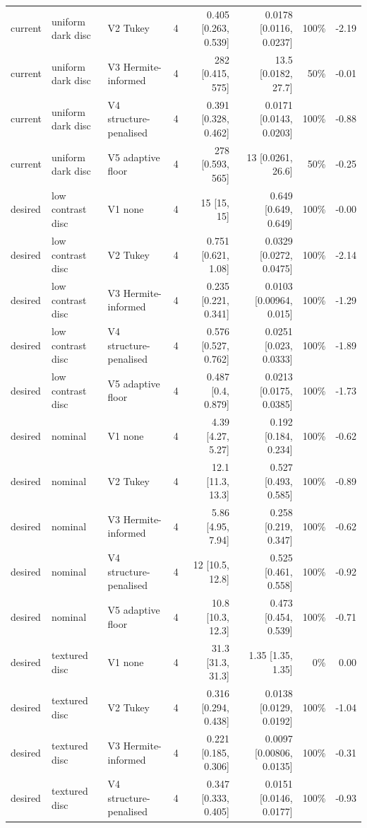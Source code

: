 \begin{tabular}{@{}lllrrrrr@{}}
current & uniform dark disc & V2 Tukey & 4 & 0.405 [0.263, 0.539] & 0.0178 [0.0116, 0.0237] & 100\% & -2.19 \\
current & uniform dark disc & V3 Hermite-informed & 4 & 282 [0.415, 575] & 13.5 [0.0182, 27.7] & 50\% & -0.01 \\
current & uniform dark disc & V4 structure-penalised & 4 & 0.391 [0.328, 0.462] & 0.0171 [0.0143, 0.0203] & 100\% & -0.88 \\
current & uniform dark disc & V5 adaptive floor & 4 & 278 [0.593, 565] & 13 [0.0261, 26.6] & 50\% & -0.25 \\
desired & low contrast disc & V1 none & 4 & 15 [15, 15] & 0.649 [0.649, 0.649] & 100\% & -0.00 \\
desired & low contrast disc & V2 Tukey & 4 & 0.751 [0.621, 1.08] & 0.0329 [0.0272, 0.0475] & 100\% & -2.14 \\
desired & low contrast disc & V3 Hermite-informed & 4 & 0.235 [0.221, 0.341] & 0.0103 [0.00964, 0.015] & 100\% & -1.29 \\
desired & low contrast disc & V4 structure-penalised & 4 & 0.576 [0.527, 0.762] & 0.0251 [0.023, 0.0333] & 100\% & -1.89 \\
desired & low contrast disc & V5 adaptive floor & 4 & 0.487 [0.4, 0.879] & 0.0213 [0.0175, 0.0385] & 100\% & -1.73 \\
desired & nominal & V1 none & 4 & 4.39 [4.27, 5.27] & 0.192 [0.184, 0.234] & 100\% & -0.62 \\
desired & nominal & V2 Tukey & 4 & 12.1 [11.3, 13.3] & 0.527 [0.493, 0.585] & 100\% & -0.89 \\
desired & nominal & V3 Hermite-informed & 4 & 5.86 [4.95, 7.94] & 0.258 [0.219, 0.347] & 100\% & -0.62 \\
desired & nominal & V4 structure-penalised & 4 & 12 [10.5, 12.8] & 0.525 [0.461, 0.558] & 100\% & -0.92 \\
desired & nominal & V5 adaptive floor & 4 & 10.8 [10.3, 12.3] & 0.473 [0.454, 0.539] & 100\% & -0.71 \\
desired & textured disc & V1 none & 4 & 31.3 [31.3, 31.3] & 1.35 [1.35, 1.35] & 0\% & 0.00 \\
desired & textured disc & V2 Tukey & 4 & 0.316 [0.294, 0.438] & 0.0138 [0.0129, 0.0192] & 100\% & -1.04 \\
desired & textured disc & V3 Hermite-informed & 4 & 0.221 [0.185, 0.306] & 0.0097 [0.00806, 0.0135] & 100\% & -0.31 \\
desired & textured disc & V4 structure-penalised & 4 & 0.347 [0.333, 0.405] & 0.0151 [0.0146, 0.0177] & 100\% & -0.93 \\

\end{tabular}
